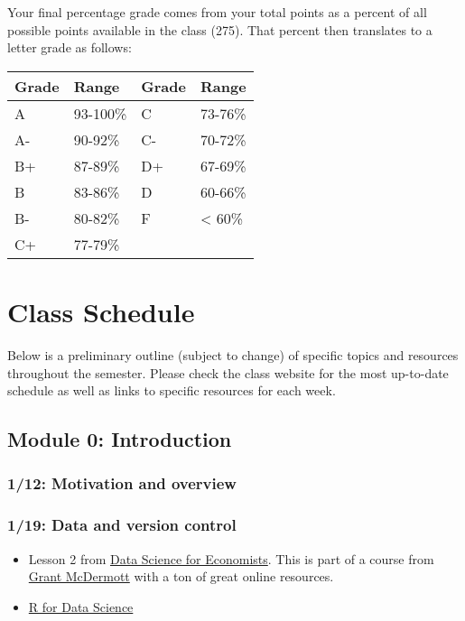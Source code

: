 \documentclass[11pt,]{article}
\providecommand{\tightlist}{%
  \setlength{\itemsep}{0pt}\setlength{\parskip}{0pt}}
\begin{document}
Your final percentage grade comes from your total points as a percent of
all possible points available in the class (275). That percent then
translates to a letter grade as follows:

\begin{longtable}[]{@{}llll@{}}
\toprule
Grade & Range & Grade & Range \\
\midrule
\endhead
A & 93-100\% & C & 73-76\% \\
A- & 90-92\% & C- & 70-72\% \\
B+ & 87-89\% & D+ & 67-69\% \\
B & 83-86\% & D & 60-66\% \\
B- & 80-82\% & F & \textless{} 60\% \\
C+ & 77-79\% & & \\
\bottomrule
\end{longtable}

\hypertarget{class-schedule}{%
\section{Class Schedule}\label{class-schedule}}

Below is a preliminary outline (subject to change) of specific topics
and resources throughout the semester. Please check the class website
for the most up-to-date schedule as well as links to specific resources
for each week.

\hypertarget{module-0-introduction}{%
\subsection{Module 0: Introduction}\label{module-0-introduction}}

\hypertarget{motivation-and-overview}{%
\subsubsection{1/12: Motivation and
overview}\label{motivation-and-overview}}

\hypertarget{data-and-version-control}{%
\subsubsection{1/19: Data and version
control}\label{data-and-version-control}}

\begin{itemize}
\tightlist
\item
  Lesson 2 from \href{https://github.com/uo-ec607/lectures}{Data Science
  for Economists}. This is part of a course from
  \href{https://grantmcdermott.com/}{Grant McDermott} with a ton of
  great online resources.
\item
  \href{https://r4ds.had.co.nz/}{R for Data Science}
\end{itemize}
\end{document}
